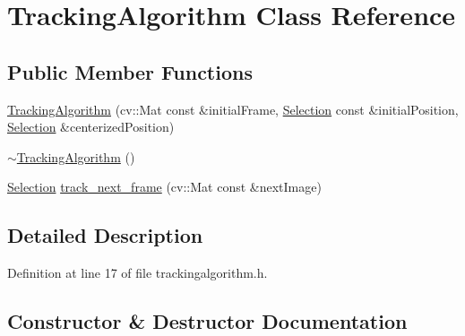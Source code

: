 \hypertarget{classTrackingAlgorithm}{}\section{Tracking\+Algorithm Class Reference}
\label{classTrackingAlgorithm}
\subsection*{Public Member Functions}
\begin{DoxyCompactItemize}
\item 
\hyperlink{classTrackingAlgorithm_aacf4a2ab0938a3147019fa8bf8a113e0}{Tracking\+Algorithm} (cv\+::\+Mat const \&initial\+Frame, \hyperlink{structSelection}{Selection} const \&initial\+Position, \hyperlink{structSelection}{Selection} \&centerized\+Position)
\item 
\hyperlink{classTrackingAlgorithm_a6838f39b3c3d4589937ec93187bf8269}{$\sim$\+Tracking\+Algorithm} ()
\item 
\hyperlink{structSelection}{Selection} \hyperlink{classTrackingAlgorithm_a8265a50f6772749471c96635deb19e07}{track\+\_\+next\+\_\+frame} (cv\+::\+Mat const \&next\+Image)
\end{DoxyCompactItemize}


\subsection{Detailed Description}


Definition at line 17 of file trackingalgorithm.\+h.



\subsection{Constructor \& Destructor Documentation}
\hypertarget{classTrackingAlgorithm_aacf4a2ab0938a3147019fa8bf8a113e0}{}
